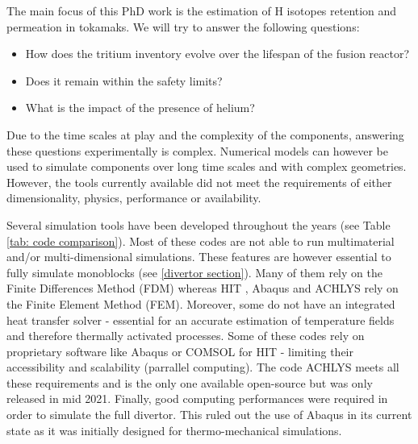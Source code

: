 The main focus of this PhD work is the estimation of H isotopes retention and permeation in tokamaks.
We will try to answer the following questions:
\begin{itemize}
    \item How does the tritium inventory evolve over the lifespan of the fusion reactor?
    \item Does it remain within the safety limits?
    \item What is the impact of the presence of helium?
\end{itemize}

Due to the time scales at play and the complexity of the components, answering these questions experimentally is complex.
Numerical models can however be used to simulate components over long time scales and with complex geometries.
However, the tools currently available did not meet the requirements of either dimensionality, physics, performance or availability.

Several simulation tools have been developed throughout the years (see Table \ref{tab: code comparison}).
Most of these codes are not able to run multimaterial and/or multi-dimensional simulations.
These features are however essential to fully simulate monoblocks (see \ref{divertor section}).
Many of them rely on the Finite Differences Method (FDM) whereas HIT , Abaqus  and ACHLYS  rely on the Finite Element Method (FEM).
Moreover, some do not have an integrated heat transfer solver - essential for an accurate estimation of temperature fields and therefore thermally activated processes.
Some of these codes rely on proprietary software like Abaqus or COMSOL for HIT - limiting their accessibility and scalability (parrallel computing).
The code ACHLYS meets all these requirements and is the only one available open-source but was only released in mid 2021.
Finally, good computing performances were required in order to simulate the full divertor.
This ruled out the use of Abaqus in its current state as it was initially designed for thermo-mechanical simulations.


